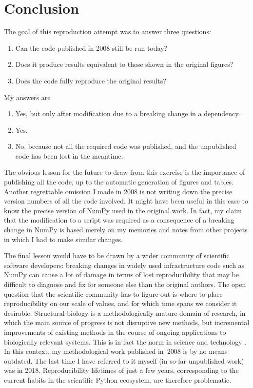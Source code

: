 \section*{Conclusion}

The goal of this reproduction attempt was to answer three questions:
\begin{enumerate}
\item Can the code published in 2008 still be run today?
\item Does it produce results equivalent to those shown in the original figures?
\item Does the code fully reproduce the original results?
\end{enumerate}

My answers are
\begin{enumerate}
\item Yes, but only after modification due to a breaking change in a dependency.
\item Yes.
\item No, because not all the required code was published, and the unpublished code has been lost in the meantime.
\end{enumerate}

The obvious lesson for the future to draw from this exercise is the importance of publishing all the code, up to the automatic generation of figures and tables. Another regrettable omission I made in 2008 is not writing down the precise version numbers of all the code involved. It might have been useful in this case to know the precise version of NumPy used in the original work. In fact, my claim that the modification to a script was required as a consequence of a breaking change in NumPy is based merely on my memories and notes from other projects in which I had to make similar changes.

The final lesson would have to be drawn by a wider community of scientific software developers: breaking changes in widely used infrastructure code such as NumPy can cause a lot of damage in terms of lost reproducibility that may be difficult to diagnose and fix for someone else than the original authors. The open question that the scientific community has to figure out is where to place reproducibility on our scale of values, and for which time spans we consider it desirable. Structural biology is a methodologically mature domain of research, in which the main source of progress is not disruptive new methods, but incremental improvements of existing methods in the course of ongoing applications to biologically relevant systems. This is in fact the norm in science and technology \cite{Arthurnaturetechnologywhat2009}. In this context, my methodological work published in~2008 is by no means outdated. The last time I have referred to it myself (in so-far unpublished work) was in 2018. Reproducibility lifetimes of just a few years, corresponding to the current habits in the scientific Python ecosystem, are therefore problematic.
